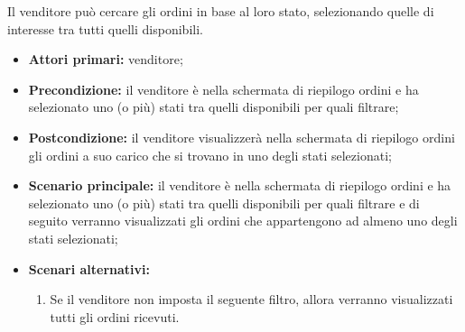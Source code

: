 Il venditore può cercare gli ordini in base al loro stato, selezionando quelle di interesse tra tutti quelli disponibili.
\begin{itemize}
	\item \textbf{Attori primari:} venditore;
	\item \textbf{Precondizione:} il venditore è nella schermata di riepilogo ordini e ha selezionato uno (o più) stati tra quelli disponibili per quali filtrare;
	\item \textbf{Postcondizione:} il venditore visualizzerà nella schermata di riepilogo ordini gli ordini a suo carico che si trovano in uno degli stati selezionati;
	\item \textbf{Scenario principale:} il venditore è nella schermata di riepilogo ordini e ha selezionato uno (o più) stati tra quelli disponibili per quali filtrare e di seguito verranno visualizzati gli ordini che appartengono ad almeno uno degli stati selezionati;
	\item \textbf{Scenari alternativi:}
	\begin{enumerate}[label=\lett]
		\item Se il venditore non imposta il seguente filtro, allora verranno visualizzati tutti gli ordini ricevuti.
	\end{enumerate}
\end{itemize}

\label{filtro-ordini-venditore.temporale}

